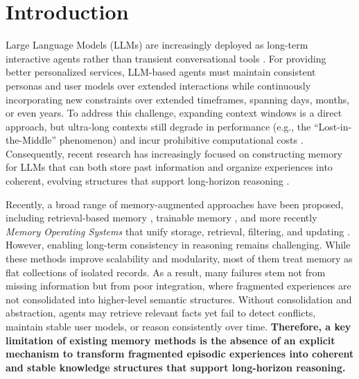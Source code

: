 \section{Introduction}

Large Language Models (LLMs) are increasingly deployed as long-term interactive agents rather than transient conversational tools \cite{Yehudai2025LLMAgentEval, Ferrag2025LLMAgents}. For providing better personalized services, LLM-based agents must maintain consistent personas and user models over extended interactions while continuously incorporating new constraints over extended timeframes, spanning days, months, or even years. To address this challenge, expanding context windows is a direct approach, but ultra-long contexts still degrade in performance (e.g., the ``Lost-in-the-Middle'' phenomenon) and incur prohibitive computational costs \cite{liu2024lost}. Consequently, recent research has increasingly focused on constructing memory for LLMs that can both store past information and organize experiences into coherent, evolving structures that support long-horizon reasoning \cite{wu2025long,maharana2024locomo}.

 Recently, a broad range of memory-augmented approaches have been proposed, including retrieval-based memory \cite{zhong2024memorybank,packer2024memgpt}, trainable memory \cite{zheng2024memoryllm,gong2024mplus}, and more recently \textit{Memory Operating Systems} that unify storage, retrieval, filtering, and updating \cite{li2025memos,kang2025memory}. However, enabling long-term consistency in reasoning remains challenging. While these methods improve scalability and modularity, most of them treat memory as flat collections of isolated records. 
As a result, many failures stem not from missing information but from poor integration, where fragmented experiences are not consolidated into higher-level semantic structures. Without consolidation and abstraction, agents may retrieve relevant facts yet fail to detect conflicts, maintain stable user models, or reason consistently over time.
%
\textbf{Therefore, a key limitation of existing memory methods is the absence of an explicit mechanism to transform fragmented episodic experiences into coherent and stable knowledge structures that support long-horizon reasoning.}



